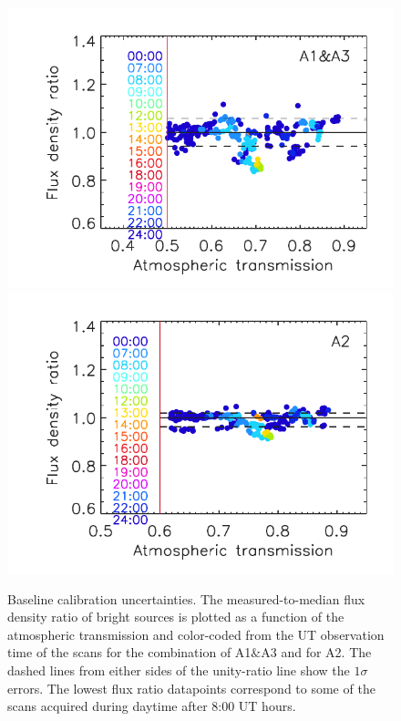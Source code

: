 %
\begin{figure}[!thbp]
  \begin{center}
    \includegraphics[clip=true, trim={0.9cm, 0.2cm, 0, 0.7cm},width=0.532\linewidth]{Figures/plot_flux_density_ratio_obstau_allbright_obsdate_corrected_skydip_narrow_1mm.pdf}
    \includegraphics[clip=true, trim={1.8cm, 0.2cm, 0.5cm, 0.7cm},width=0.455\linewidth]{Figures/plot_flux_density_ratio_obstau_allbright_obsdate_corrected_skydip_narrow_a2.pdf}
    
    \caption[Baseline calibration rms error estimate]{Baseline
      calibration uncertainties. The
      measured-to-median flux density ratio of bright sources is
      plotted as a function of the atmospheric transmission and color-coded from the UT
      observation time of the scans for the combination of A1$\&$A3
      and for A2. 
      The dashed lines from either sides of the
      unity-ratio line
      show the $1\sigma$ %
      errors.
      The lowest flux ratio datapoints correspond to some of the
      scans acquired during daytime after 8:00 UT hours.
    }
    \label{fig:allbright_rms_corrected_skydip}
  \end{center}
\end{figure}




